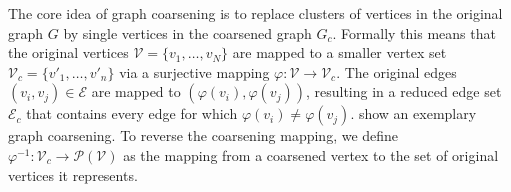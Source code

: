 The core idea of graph coarsening is to replace clusters of vertices in the original graph $G$ by single vertices in the coarsened graph $G_c$.
Formally this means that the original vertices $\mathcal{V} = \{ v_1, \dots, v_N \}$ are mapped to a smaller vertex set $\mathcal{V}_c = \{ v'_1, \dots, v'_n \}$ via a surjective mapping $\varphi: \mathcal{V} \to \mathcal{V}_c$.
The original edges $(v_i, v_j) \in \mathcal{E}$ are mapped to $(\varphi(v_i), \varphi(v_j))$, resulting in a reduced edge set $\mathcal{E}_c$ that contains every edge for which $\varphi(v_i) \neq \varphi(v_j)$.
 show an exemplary graph coarsening.
To reverse the coarsening mapping, we define $\varphi^{-1}: \mathcal{V}_c \to \mathcal{P}(\mathcal{V})$ as the mapping from a coarsened vertex to the set of original vertices it represents.
